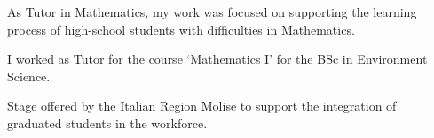 \documentclass[letterpaper]{deedy-resume} %
\begin{document}
\begin{minipage}[t]{0.66\textwidth}
\sectionspace %



\begin{tightitemize}
\item As Tutor in Mathematics, my work was focused on supporting the learning process of high-school students with difficulties in Mathematics. 
\end{tightitemize}

\sectionspace


\begin{tightitemize}
\item I worked as Tutor for the course `Mathematics I' for the BSc in Environment Science. 
\end{tightitemize}

\sectionspace


\begin{tightitemize}
\item Stage offered by the Italian Region Molise to support the integration of graduated students in the workforce. 
\end{tightitemize}

\sectionspace %


%
%
%
%
%
%


\end{minipage}
\end{document}
